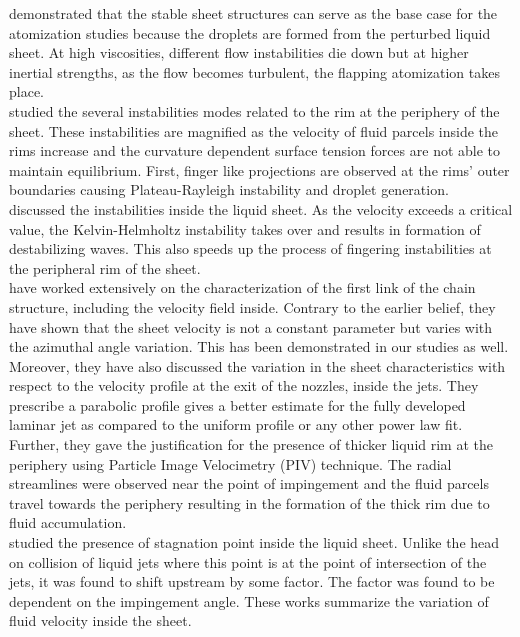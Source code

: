\cite{ibrahim1991impinging} demonstrated that the stable sheet structures can serve as the base case for the atomization studies because the droplets are formed from the perturbed liquid sheet. At high viscosities, different flow instabilities die down but at higher inertial strengths, as the flow becomes turbulent, the flapping atomization takes place.\\
\cite{bremond2006atomization} studied the several instabilities modes related to the rim at the periphery of the sheet. These instabilities are magnified as the velocity of fluid parcels inside the rims increase and the curvature dependent surface tension forces are not able to maintain equilibrium. First, finger like projections are observed at the rims' outer boundaries causing Plateau-Rayleigh instability and droplet generation.\\
\cite{clanet2002life,villermaux2002life} discussed the instabilities inside the liquid sheet. As the velocity exceeds a critical value, the Kelvin-Helmholtz instability takes over and results in formation of destabilizing waves. This also speeds up the process of fingering instabilities at the peripheral rim of the sheet.\\
\cite{choo2001parametric,choo2002velocity,choo2007effect} have worked extensively on the characterization of the first link of the chain structure, including the velocity field inside. Contrary to the earlier belief, they have shown that the sheet velocity is not a constant parameter but varies with the azimuthal angle variation. This has been demonstrated in our studies as well. Moreover, they have also discussed the variation in the sheet characteristics with respect to the velocity profile at the exit of the nozzles, inside the jets. They prescribe a parabolic profile gives a better estimate for the fully developed laminar jet as compared to the uniform profile or any other power law fit. Further, they gave the justification for the presence of thicker liquid rim at the periphery using Particle Image Velocimetry (PIV) technique. The radial streamlines were observed near the point of impingement and the fluid parcels travel towards the periphery resulting in the formation of the thick rim due to fluid accumulation. \\
\cite{inamura2014effect} studied the presence of stagnation point inside the liquid sheet. Unlike the head on collision of liquid jets where this point is at the point of intersection of the jets, it was found to shift upstream by some factor. The factor was found to be dependent on the impingement angle. These works summarize the variation of fluid velocity inside the sheet.\\
